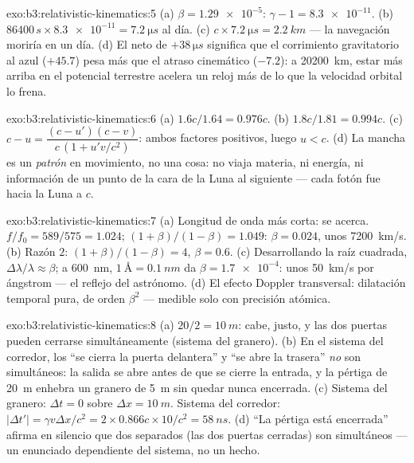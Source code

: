 \begin{solution}{exo:b3:relativistic-kinematics:5}
(a) $\beta = \num{1.29e-5}$: $\gamma - 1 = \num{8.3e-11}$. (b)
$86400\,\unit{s} \times \num{8.3e-11} = \qty{7.2}{\micro s}$ al día.
(c) $c \times \qty{7.2}{\micro s} = \qty{2.2}{km}$ --- la navegación
moriría en un día. (d) El neto de $+38\,\unit{\micro s}$ significa que el
corrimiento gravitatorio al azul ($+45.7$) pesa más que el atraso cinemático
($-7.2$): a \qty{20200}{km}, estar más arriba en el potencial terrestre
acelera un reloj más de lo que la velocidad orbital lo frena.
\end{solution}

\begin{solution}{exo:b3:relativistic-kinematics:6}
(a) $1.6c/1.64 = 0.976c$. (b) $1.8c/1.81 = 0.994c$. (c) $c - u =
\dfrac{(c - u')(c - v)}{c\,(1 + u'v/c^2)}$: ambos factores positivos, luego
$u < c$. (d) La mancha es un \emph{patrón} en movimiento, no una cosa: no
viaja materia, ni energía, ni información de un punto de la cara de la Luna
al siguiente --- cada fotón fue hacia la Luna a $c$.
\end{solution}

\begin{solution}{exo:b3:relativistic-kinematics:7}
(a) Longitud de onda más corta: se acerca. $f/f_0 = 589/575 = 1.024$;
$(1+\beta)/(1-\beta) = 1.049$: $\beta = 0.024$, unos
\qty{7200}{km/s}. (b) Razón $2$: $(1+\beta)/(1-\beta) = 4$, $\beta =
0.6$. (c) Desarrollando la raíz cuadrada, $\Delta\lambda/\lambda \approx
\beta$; a \qty{600}{nm}, $\qty{1}{\angstrom} = \qty{0.1}{nm}$ da
$\beta = \num{1.7e-4}$: unos \qty{50}{km/s} por ángstrom --- el
reflejo del astrónomo. (d) El efecto Doppler transversal: dilatación
temporal pura, de orden $\beta^2$ --- medible solo con precisión
atómica.
\end{solution}

\begin{solution}{exo:b3:relativistic-kinematics:8}
(a) $20/2 = \qty{10}{m}$: cabe, justo, y las dos puertas pueden cerrarse
simultáneamente (sistema del granero). (b) En el sistema del corredor, los
 ``se cierra la puerta delantera'' y ``se abre la trasera''
\emph{no} son simultáneos: la salida se abre antes de que se cierre la
entrada, y la pértiga de \qty{20}{m} enhebra un granero de \qty{5}{m} sin
quedar nunca encerrada. (c) Sistema del granero: $\Delta t = 0$ sobre $\Delta x =
\qty{10}{m}$. Sistema del corredor: $|\Delta t'| = \gamma v\Delta x/c^2 =
2 \times 0.866c \times 10/c^2 = \qty{58}{ns}$. (d) ``La pértiga está
encerrada'' afirma en silencio que dos  separados (las dos puertas
cerradas) son simultáneos --- un enunciado dependiente del sistema, no un
hecho.
\end{solution}

